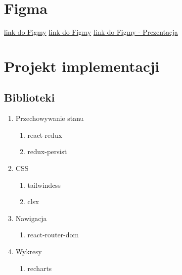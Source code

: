 \documentclass[a4paper,11pt]{article}
\begin{document}
\section{Figma}
\href{https://www.figma.com/file/6HQmM9ssZsjX2jbWcm6bmN/PGUI_PANEL_SPRZEDAWCY?node-id=0%3A1&t=sC3RxEjXZwQHD2Ov-0}{link do Figmy}
\href{https://www.figma.com/file/6HQmM9ssZsjX2jbWcm6bmN/PGUI_PANEL_SPRZEDAWCY?node-id=0%3A1&t=509EkGfDzHvN31J9-0}{link do Figmy}
\href{https://www.figma.com/proto/6HQmM9ssZsjX2jbWcm6bmN/PGUI_PANEL_SPRZEDAWCY?node-id=34%3A16652&scaling=contain&page-id=0%3A1&starting-point-node-id=34%3A16652}{link do Figmy - Prezentacja}
\section{Projekt implementacji}
\subsection{Biblioteki}
\begin{enumerate}
    \item Przechowywanie stanu
    \begin{enumerate}
        \item react-redux
        \item redux-persist
    \end{enumerate}
    \item CSS
    \begin{enumerate}
        \item tailwindcss
        \item clsx
    \end{enumerate}
    \item Nawigacja
    \begin{enumerate}
        \item react-router-dom
    \end{enumerate}
    \item Wykresy
    \begin{enumerate}
        \item recharts
    \end{enumerate}
\end{enumerate}
\end{document}
